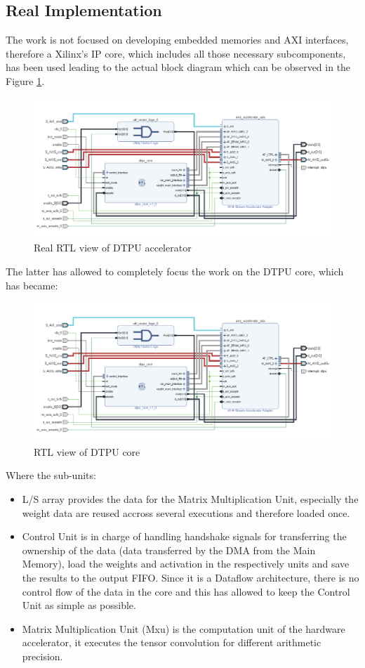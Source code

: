 \subsection{Real Implementation}
The work is not focused on developing embedded memories and AXI interfaces, therefore a Xilinx's IP core, which includes all those necessary subcomponents, has been used\cite{paper:43} leading to the actual block diagram which can be observed in the Figure \ref{fig:rtlaccel}.
\begin{figure}[H]
\centering
\captionsetup{justification=centering}
\includegraphics[scale=0.8,angle=0]{./figure/accelerator_schematic.png}
\caption{Real RTL view of DTPU accelerator}
\label{fig:rtlaccel}
\end{figure} 
The latter has allowed to completely focus the work on the DTPU core, which has became:
\begin{figure}[H]
\centering
\captionsetup{justification=centering}
\includegraphics[scale=0.8,angle=0]{./figure/accelerator_schematic.png}
\caption{RTL view of DTPU core }
\label{fig:dtpucore}
\end{figure} 
Where the sub-units:
\begin{itemize}
\item L/S array provides the data for the Matrix Multiplication Unit, especially the weight data are reused accross several executions and therefore loaded once.
\item Control Unit is in charge of handling handshake signals for transferring the ownership of the data (data transferred by the DMA from the Main Memory), load the weights and activation in the respectively units and save the results to the output FIFO. Since it is a Dataflow architecture, there is no control flow of the data in the core and this has allowed to keep the Control Unit as simple as possible.
\item Matrix Multiplication Unit (Mxu) is the computation unit of the hardware accelerator, it executes the tensor convolution for different arithmetic precision.
\end{itemize}
\newpage
